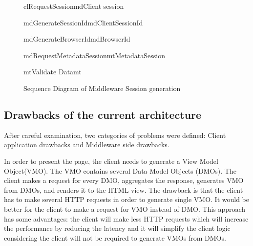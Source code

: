\begin{figure}[h]
\begin{center}

	\resizebox{1.1\textwidth}{0.5\textwidth} {

	\begin{sequencediagram}

	\begin{call}{cl}{RequestSession}{md}{Client session}

		\begin{call}{md}{GenerateSessionId}{md}{ClientSessionId} \end{call}
		\begin{call}{md}{GenerateBrowserId}{md}{BrowserId} \end{call}
		\begin{call}{md}{RequestMetadataSession}{mt}{MetadataSession} 
			\begin{call}{mt}{Validate Data}{mt}{}\end{call}
		\end{call}

	\end{call}

	\end{sequencediagram}
	}

\end{center}
\caption{Sequence Diagram of Middleware Session generation}
\label{fig:arch_sess_uml}
\end{figure}


\subsection{Drawbacks of the current architecture}

After careful examination, two categories of problems were defined: Client application drawbacks and Middleware side drawbacks. 

In order to present the page, the client needs to generate a View Model Object(VMO). The VMO contains several Data Model Objects (DMOs). The client makes a request for every DMO, aggregates the response, generates VMO from DMOs, and renders it to the HTML view. The drawback is that the client has to make several HTTP requests in order to generate single VMO. It would be better for the client to make a request for VMO instead of DMO. This approach has some advantages: the client will make less HTTP requests which will increase the performance by reducing the latency and it will simplify the client logic considering the client will not be required to generate VMOs from DMOs. 

